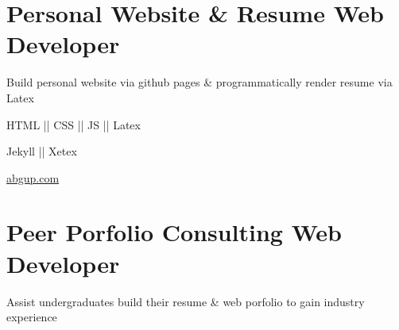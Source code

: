 \vspace{2.5ex}


\section{
    \textbf{Personal Website \& Resume} \newline
    Web Developer
}{}

\vspace{-2.5ex}

\begin{detail}
    \BulletItem
    Build personal website via github pages \& programmatically render resume via Latex

\end{detail}

\begin{subtitle}
    \vspace{-5ex}
    {{}} 
\end{subtitle}

\vspace{-1.5ex}
{
    \vspace{-0.8ex}
    \color{cyan}\small
    {HTML || CSS || JS || Latex}
}

{
    \vspace{-2.5ex}\hspace{1.5in}
    \color{cyan}\small
    {Jekyll || Xetex}
}

{
    \vspace{-2.5ex}\hspace{3in}
    \color{blue}\small
    {\href{https://abgup.com}{abgup.com}{}}
}

\vspace{2.5ex}


\section{
    \textbf{Peer Porfolio Consulting} \newline
    Web Developer
}{}


\vspace{-2.5ex}

\begin{detail}
    \BulletItem
    Assist undergraduates build their resume \& web porfolio to gain industry experience
\end{detail}


